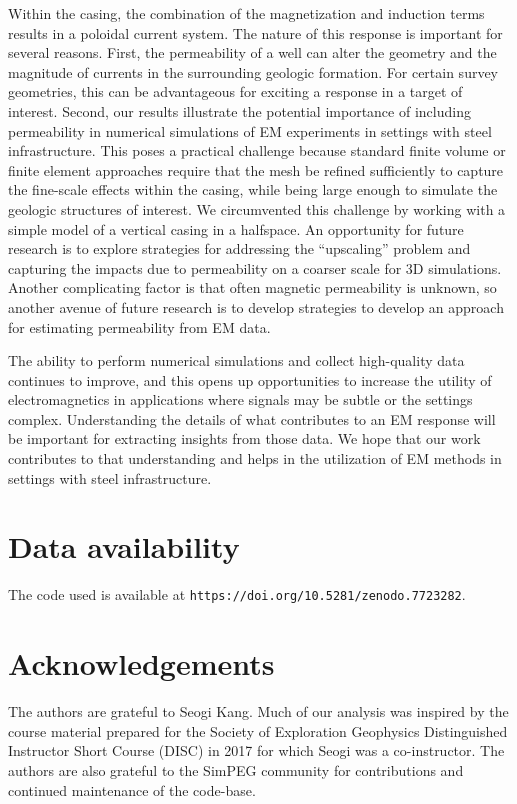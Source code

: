 \documentclass[onecolumn, extra, mreferee]{gji}
\begin{document}
Within the casing, the combination of the magnetization and induction terms results in a poloidal current system. The nature of this response is important for several reasons. First, the permeability of a well can alter the geometry and the magnitude of currents in the surrounding geologic formation. For certain survey geometries, this can be advantageous for exciting a response in a target of interest. Second, our results illustrate the potential importance of including permeability in numerical simulations of EM experiments in settings with steel infrastructure. This poses a practical challenge because standard finite volume or finite element approaches require that the mesh be refined sufficiently to capture the fine-scale effects within the casing, while being large enough to simulate the geologic structures of interest. We circumvented this challenge by working with a simple model of a vertical casing in a halfspace. An opportunity for future research is to explore strategies for addressing the ``upscaling'' problem and capturing the impacts due to permeability on a coarser scale for 3D simulations. Another complicating factor is that often magnetic permeability is unknown, so another avenue of future research is to develop strategies to develop an approach for estimating permeability from EM data.

The ability to perform numerical simulations and collect high-quality data continues to improve, and this opens up opportunities to increase the utility of electromagnetics in applications where signals may be subtle or the settings complex. Understanding the details of what contributes to an EM response will be important for extracting insights from those data. We hope that our work contributes to that understanding and helps in the utilization of EM methods in settings with steel infrastructure.


\section{Data availability}

The code used is available at \texttt{https://doi.org/10.5281/zenodo.7723282}.

\section{Acknowledgements}
The authors are grateful to Seogi Kang. Much of our analysis was inspired by the course material prepared for the Society of Exploration Geophysics Distinguished Instructor Short Course (DISC) in 2017 for which Seogi was a co-instructor. The authors are also grateful to the SimPEG community for contributions and continued maintenance of the code-base.
\end{document}
